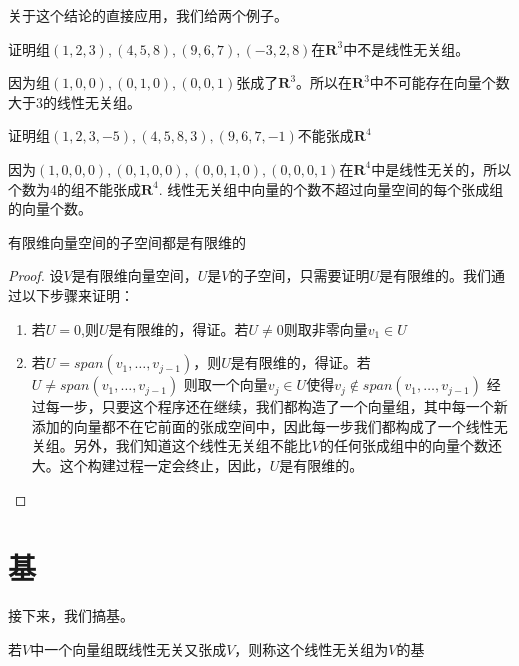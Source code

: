 \documentclass[10pt,a4paper,UTF8]{article}
\begin{document}
关于这个结论的直接应用，我们给两个例子。
\begin{instance}
证明组\((1,2,3),(4,5,8),(9,6,7),(-3,2,8)\)在\(\mathbf{R}^{3}\)中不是线性无关组。

因为组\((1,0,0),(0,1,0),(0,0,1)\)张成了\(\mathbf{R}^{3}\)。所以在\(\mathbf{R}^{3}\)中不可能存在向量个数大于3的线性无关组。
\end{instance}

\begin{instance}
证明组\((1,2,3,-5),(4,5,8,3),(9,6,7,-1)\)不能张成\(\mathbf{R}^{4}\)

因为\((1,0,0,0),(0,1,0,0),(0,0,1,0),(0,0,0,1)\)在\(\mathbf{R}^{4}\)中是线性无关的，所以个数为4的组不能张成\(\mathbf{R}^{4}\). 线性无关组中向量的个数不超过向量空间的每个张成组的向量个数。
\end{instance}

\begin{theorem}
有限维向量空间的子空间都是有限维的
\end{theorem}
\begin{proof}
设\(V\)是有限维向量空间，\(U\)是\(V\)的子空间，只需要证明\(U\)是有限维的。我们通过以下步骤来证明：

\begin{enumerate}
\item 若\(U={0}\),则\(U\)是有限维的，得证。若\(U\neq {0}\)则取非零向量\(v_{1}\in U\)
\item 若\(U = span(v_{1},\ldots ,v_{j-1})\)，则\(U\)是有限维的，得证。若\(U \neq span(v_{1},\ldots ,v_{j-1})\) 则取一个向量\(v_{j}\in U\)使得\(v_{j} \notin span(v_{1},\ldots ,v_{j-1})\) 经过每一步，只要这个程序还在继续，我们都构造了一个向量组，其中每一个新添加的向量都不在它前面的张成空间中，因此每一步我们都构成了一个线性无关组。另外，我们知道这个线性无关组不能比\(V\)的任何张成组中的向量个数还大。这个构建过程一定会终止，因此，\(U\)是有限维的。
\end{enumerate}
\end{proof}

\section{基}
\label{sec:orgheadline3}


接下来，我们搞基。
\begin{definition}[基]
若\(V\)中一个向量组既线性无关又张成\(V\)，则称这个线性无关组为\(V\)的基
\end{definition}
\end{document}
